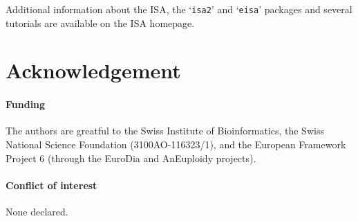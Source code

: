 \documentclass{bioinfo}
\newcommand{\Rpackage}[1]{`\texttt{#1}'}
\begin{document}
Additional information about the ISA, the \Rpackage{isa2} and
\Rpackage{eisa} packages and several tutorials are available on the
ISA homepage.

\section*{Acknowledgement}

\paragraph{Funding\textcolon} The authors are greatful to the Swiss
Institute of Bioinformatics, the Swiss National Science Foundation
(3100AO-116323/1), and the European Framework Project 6 (through
the EuroDia and AnEuploidy projects).
\paragraph{Conflict of interest\textcolon} None declared.



\end{document}
